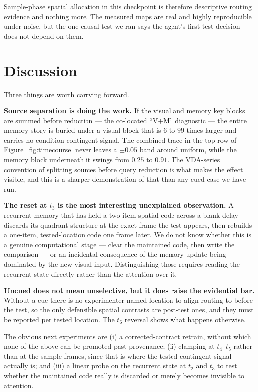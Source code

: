 \documentclass[10pt]{article}
\begin{document}
Sample-phase spatial allocation in this checkpoint is therefore descriptive routing evidence
and nothing more. The measured maps are real and highly reproducible under noise, but the
one causal test we ran says the agent's first-test decision does not depend on them.

\section{Discussion}

Three things are worth carrying forward.

\textbf{Source separation is doing the work.} If the visual and memory key blocks are summed
before reduction --- the co-located ``V$+$M'' diagnostic --- the entire memory story is
buried under a visual block that is $6$ to $99$ times larger and carries no
condition-contingent signal. The combined trace in the top row of
Figure~\ref{fig:timecourse} never leaves a $\pm0.05$ band around uniform, while the memory
block underneath it swings from $0.25$ to $0.91$. The VDA-series convention of splitting
sources before query reduction is what makes the effect visible, and this is a sharper
demonstration of that than any cued case we have run.

\textbf{The reset at $t_3$ is the most interesting unexplained observation.} A recurrent
memory that has held a two-item spatial code across a blank delay discards its quadrant
structure at the exact frame the test appears, then rebuilds a one-item, tested-location code
one frame later. We do not know whether this is a genuine computational stage --- clear the
maintained code, then write the comparison --- or an incidental consequence of the memory
update being dominated by the new visual input. Distinguishing those requires reading the
recurrent state directly rather than the attention over it.

\textbf{Uncued does not mean unselective, but it does raise the evidential bar.} Without a
cue there is no experimenter-named location to align routing to before the test, so the only
defensible spatial contrasts are post-test ones, and they must be reported per tested
location. The $t_6$ reversal shows what happens otherwise.

The obvious next experiments are (i) a corrected-contract retrain, without which none of the
above can be promoted past provenance; (ii) clamping at $t_4$--$t_5$ rather than at the sample
frames, since that is where the tested-contingent signal actually is; and (iii) a linear
probe on the recurrent state at $t_2$ and $t_3$ to test whether the maintained code really is
discarded or merely becomes invisible to attention.
\end{document}
